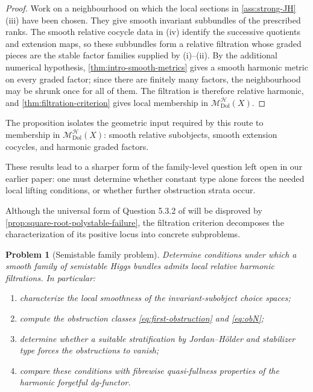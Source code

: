 \documentclass[11pt,reqno]{amsart}
\newtheorem{problem}[theorem]{Problem}
\theoremstyle{definition}
\theoremstyle{remark}
\newcommand{\cH}{\mathcal H}
\newcommand{\Dol}{\mathrm{Dol}}
\newcommand{\MHDol}{\mathscr M^{\cH}_{\Dol}}
\begin{document}
\begin{proof}
Work on a neighbourhood on which the local sections in
\cref{ass:strong-JH}(iii) have been chosen.  They give smooth invariant
subbundles of the prescribed ranks.  The smooth relative cocycle data
in (iv) identify the successive quotients and extension maps, so these
subbundles form a relative filtration whose graded pieces are the
stable factor families supplied by (i)--(ii).  By the additional
numerical hypothesis, \cref{thm:intro-smooth-metrics} gives a smooth
harmonic metric on every graded factor; since there are finitely many
factors, the neighbourhood may be shrunk once for all of them.  The
filtration is therefore relative harmonic, and
\cref{thm:filtration-criterion} gives local membership in
$\MHDol(X)$.
\end{proof}

The proposition isolates the geometric input required by this route to membership in $\MHDol(X)$: smooth relative subobjects, smooth extension cocycles, and harmonic graded factors.


These results lead to a sharper form of the family-level question left open in our earlier paper: one must determine whether constant type alone forces the needed local lifting conditions, or whether further obstruction strata occur.


Although the universal form of Question 5.3.2 of \cite{AzamRayan2026} will be disproved by \cref{prop:square-root-polystable-failure}, the filtration criterion decomposes the characterization of its positive locus into concrete subproblems.

\begin{problem}[Semistable family problem]\label{prob:semistable-family}
Determine conditions under which a smooth family of semistable Higgs bundles admits local relative harmonic filtrations.  In particular:
\begin{enumerate}[label=(\alph*)]
\item characterize the local smoothness of the invariant-subobject choice spaces;
\item compute the obstruction classes \eqref{eq:first-obstruction} and \eqref{eq:obN};
\item determine whether a suitable stratification by Jordan--H\"older and stabilizer type forces the obstructions to vanish;
\item compare these conditions with fibrewise quasi-fullness properties of the harmonic forgetful dg-functor.
\end{enumerate}
\end{problem}
\end{document}
